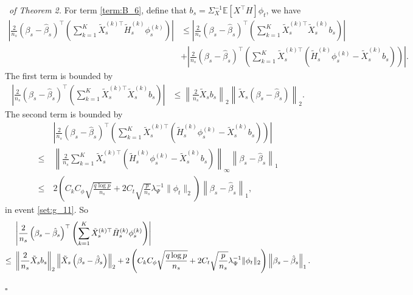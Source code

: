 \documentclass[12pt]{article}
\newenvironment{pf}{{\noindent \it Proof}\ }{\hfill $\square$\par}
\begin{document}
\begin{pf}{\it of Theorem 2. }
    For term \ref{term:B_6}, define that $b_s = \Sigma_X^{-1}\mathbb{E} [X^\top H] \phi_t$, we have
    \begin{align*}
        \left|\frac{2}{n_s}\left(\beta_s - \hat{\beta}_s\right)^\top\left(\sum_{k=1}^K \tilde{X}_s^{(k)\top}\tilde{H}_s^{(k)}\phi_s^{(k)}\right)\right|&\le 
    \left|\frac{2}{n_s}\left(\beta_s - \hat{\beta}_s\right)^\top\left(\sum_{k=1}^K \tilde{X}_s^{(k)\top}\tilde{X}_s^{(k)}b_s\right)\right|\\&+ \left|\frac{2}{n_s}\left(\beta_s - \hat{\beta}_s\right)^\top\left(\sum_{k=1}^K \tilde{X}_s^{(k)\top}\left(\tilde{H}_s^{(k)}\phi_s^{(k)}- \tilde{X}_s^{(k)}b_s\right)\right)\right|.
    \end{align*}
    The first term is bounded by
    \begin{align*}
         \left|\frac{2}{n_s}\left(\beta_s - \hat{\beta}_s\right)^\top\left(\sum_{k=1}^K \tilde{X}_s^{(k)\top}\tilde{X}_s^{(k)}b_s\right)\right| &\le \left\|\frac{2}{n_s}\tilde{X}_s b_s\right\|_2\left\|\tilde{X}_s\left(\beta_s - \hat{\beta}_s\right)\right\|_2. 
    \end{align*}
    The second term is bounded by
    \begin{align*}
       &  \left|\frac{2}{n_s}\left(\beta_s - \hat{\beta}_s\right)^\top\left(\sum_{k=1}^K \tilde{X}_s^{(k)\top}\left(\tilde{H}_s^{(k)}\phi_s^{(k)}- \tilde{X}_s^{(k)}b_s\right)\right)\right|\\ \le\ & 
       \left\|\frac{2}{n_s}\sum_{k=1}^K \tilde{X}_s^{(k)\top}\left(\tilde{H}_s^{(k)}\phi_s^{(k)}- \tilde{X}_s^{(k)}b_s\right)\right\|_{\infty}\left\|\beta_s - \hat{\beta}_s\right\|_1\\\le\ & 
       2\left(C_kC_\phi \sqrt{\frac{q\log p}{n_s}}+  2C_t \sqrt{\frac{p}{n_s}}\lambda_\Psi^{-1} \|\phi_t\|_2\right)\left\|\beta_s - \hat{\beta}_s\right\|_1,
    \end{align*}
    in event \ref{set:g_11}. So
    \begin{align}
       & \left|\frac{2}{n_s}\left(\beta_s - \hat{\beta}_s\right)^\top\left(\sum_{k=1}^K \tilde{X}_s^{(k)\top}\tilde{H}_s^{(k)}\phi_s^{(k)}\right)\right|\notag \\  \le\ &  \left\|\frac{2}{n_s}\tilde{X}_s b_s\right\|_2\left\|\tilde{X}_s\left(\beta_s - \hat{\beta}_s\right)\right\|_2+2\left(C_kC_\phi \sqrt{\frac{q\log p}{n_s}}+  2C_t \sqrt{\frac{p}{n_s}}\lambda_\Psi^{-1} \|\phi_t\|_2\right) \left\|\beta_s - \hat{\beta}_s\right\|_1\label{eq:error_bound_B6}. 
    \end{align}


\end{pf}
\end{document}
